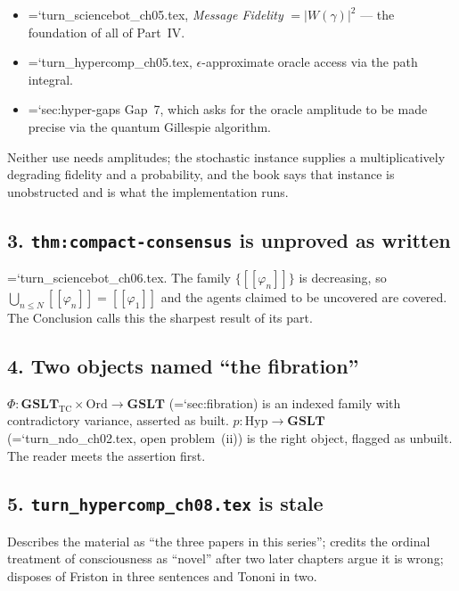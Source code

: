\documentclass[11pt,letterpaper]{article}
\newcommand{\loc}[1]{{\small\ttfamily\color{accent}\hyphenchar\font=`\-\relax #1}}
\providecommand{\llbracket}{[\![}
\providecommand{\rrbracket}{]\!]}
\begin{document}
\begin{itemize}[leftmargin=1.2em,itemsep=2pt]
\item \loc{turn\_sciencebot\_ch05.tex}, \emph{Message Fidelity}
      $= |W(\gamma)|^{2}$ --- the foundation of all of Part~IV.
\item \loc{turn\_hypercomp\_ch05.tex}, $\epsilon$-approximate oracle
      access via the path integral.
\item \loc{sec:hyper-gaps} Gap~7, which asks for the oracle amplitude
      to be made precise via the quantum Gillespie algorithm.
\end{itemize}

Neither use needs amplitudes; the stochastic instance supplies a
multiplicatively degrading fidelity and a probability, and the book
says that instance is unobstructed and is what the implementation runs.

\subsection*{3. \texttt{thm:compact-consensus} is unproved as written}

\loc{turn\_sciencebot\_ch06.tex}. The family
$\{\llbracket\varphi_n\rrbracket\}$ is decreasing, so
$\bigcup_{n\le N}\llbracket\varphi_n\rrbracket =
\llbracket\varphi_1\rrbracket$ and the agents claimed to be uncovered
are covered. The Conclusion calls this the sharpest result of its part.

\subsection*{4. Two objects named ``the fibration''}

$\Phi : \mathbf{GSLT}_{\mathrm{TC}} \times \mathrm{Ord} \to
\mathbf{GSLT}$ (\loc{sec:fibration}) is an indexed family with
contradictory variance, asserted as built.
$p : \mathrm{Hyp} \to \mathbf{GSLT}$ (\loc{turn\_ndo\_ch02.tex}, open
problem~(ii)) is the right object, flagged as unbuilt. The reader meets
the assertion first.

\subsection*{5. \texttt{turn\_hypercomp\_ch08.tex} is stale}

Describes the material as ``the three papers in this series''; credits
the ordinal treatment of consciousness as ``novel'' after two later
chapters argue it is wrong; disposes of Friston in three sentences and
Tononi in two.
\end{document}
